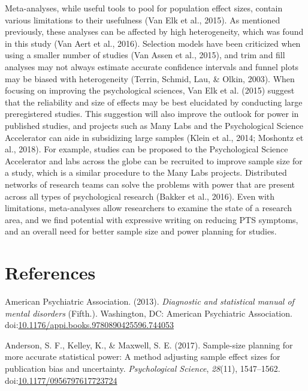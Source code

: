 \documentclass[man]{apa6}
\theoremstyle{definition}
\theoremstyle{definition}
\theoremstyle{definition}
\theoremstyle{remark}
\begin{document}
Meta-analyses, while useful tools to pool for population effect sizes,
contain various limitations to their usefulness (Van Elk et al., 2015).
As mentioned previously, these analyses can be affected by high
heterogeneity, which was found in this study (Van Aert et al., 2016).
Selection models have been criticized when using a smaller number of
studies (Van Assen et al., 2015), and trim and fill analyses may not
always estimate accurate confidence intervals and funnel plots may be
biased with heterogeneity (Terrin, Schmid, Lau, \& Olkin, 2003). When
focusing on improving the psychological sciences, Van Elk et al. (2015)
suggest that the reliability and size of effects may be best elucidated
by conducting large preregistered studies. This suggestion will also
improve the outlook for power in published studies, and projects such as
Many Labs and the Psychological Science Accelerator can aide in
subsidizing large samples (Klein et al., 2014; Moshontz et al., 2018).
For example, studies can be proposed to the Psychological Science
Accelerator and labs across the globe can be recruited to improve sample
size for a study, which is a similar procedure to the Many Labs
projects. Distributed networks of research teams can solve the problems
with power that are present across all types of psychological research
(Bakker et al., 2016). Even with limitations, meta-analyses allow
researchers to examine the state of a research area, and we find
potential with expressive writing on reducing PTS symptoms, and an
overall need for better sample size and power planning for studies.

\newpage

\section{References}\label{references}

\setlength{\parindent}{-0.5in} \setlength{\leftskip}{0.5in}

\hypertarget{refs}{}
\hypertarget{ref-AmericanPsychiatricAssociation2013}{}
American Psychiatric Association. (2013). \emph{Diagnostic and
statistical manual of mental disorders} (Fifth.). Washington, DC:
American Psychiatric Association.
doi:\href{https://doi.org/10.1176/appi.books.9780890425596.744053}{10.1176/appi.books.9780890425596.744053}

\hypertarget{ref-Anderson2017a}{}
Anderson, S. F., Kelley, K., \& Maxwell, S. E. (2017). Sample-size
planning for more accurate statistical power: A method adjusting sample
effect sizes for publication bias and uncertainty. \emph{Psychological
Science}, \emph{28}(11), 1547--1562.
doi:\href{https://doi.org/10.1177/0956797617723724}{10.1177/0956797617723724}
\end{document}
